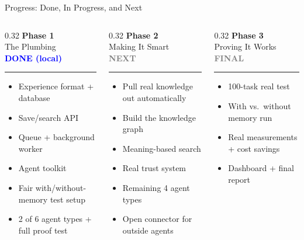 \documentclass{beamer}
\begin{document}
\begin{frame}{Progress: Done, In Progress, and Next}
\small
\begin{columns}[T]

\begin{column}{0.32\textwidth}
\textbf{Phase 1} \\
\footnotesize The Plumbing \\
\textcolor{blue}{\textbf{DONE (local)}}
\rule{\linewidth}{0.4pt}
\begin{itemize}\footnotesize
\item[\checkmark] Experience format + database
\item[\checkmark] Save/search API
\item[\checkmark] Queue + background worker
\item[\checkmark] Agent toolkit
\item[\checkmark] Fair with/without-memory test setup
\item[\checkmark] 2 of 6 agent types + full proof test
\end{itemize}
\end{column}

\begin{column}{0.32\textwidth}
\textbf{Phase 2} \\
\footnotesize Making It Smart \\
\textcolor{gray}{\textbf{NEXT}}
\rule{\linewidth}{0.4pt}
\begin{itemize}\footnotesize
\item[$\circ$] Pull real knowledge out automatically
\item[$\circ$] Build the knowledge graph
\item[$\circ$] Meaning-based search
\item[$\circ$] Real trust system
\item[$\circ$] Remaining 4 agent types
\item[$\circ$] Open connector for outside agents
\end{itemize}
\end{column}

\begin{column}{0.32\textwidth}
\textbf{Phase 3} \\
\footnotesize Proving It Works \\
\textcolor{gray}{\textbf{FINAL}}
\rule{\linewidth}{0.4pt}
\begin{itemize}\footnotesize
\item[$\circ$] 100-task real test
\item[$\circ$] With vs.\ without memory run
\item[$\circ$] Real measurements + cost savings
\item[$\circ$] Dashboard + final report
\end{itemize}
\end{column}


\end{columns}
\end{frame}
\end{document}
